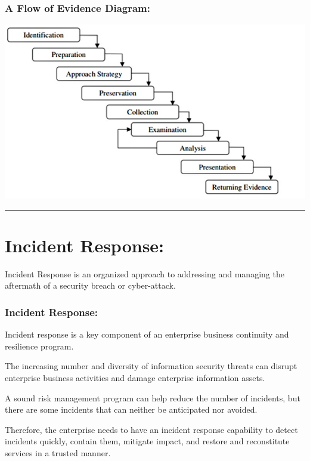 \documentclass[british]{article}
\begin{document}
\section{A Flow of Evidence Diagram:}
\begin{center}
	\includegraphics[scale=0.5]{Pictures/DF}
	\par\end{center}

\rule[0.5ex]{0.75\columnwidth}{1pt}

\part{Incident Response:}

Incident Response is an organized approach to addressing and managing
the aftermath of a security breach or cyber-attack.

\section{Incident Response:}

Incident response is a key component of an enterprise business continuity
and resilience program.

The increasing number and diversity of information security threats
can disrupt enterprise business activities and damage enterprise information
assets.

A sound risk management program can help reduce the number of incidents,
but there are some incidents that can neither be anticipated nor avoided.

Therefore, the enterprise needs to have an incident response capability
to detect incidents quickly, contain them, mitigate impact, and restore
and reconstitute services in a trusted manner.
\end{document}
